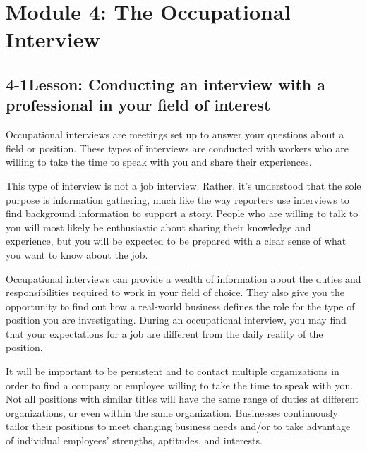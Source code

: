 \pagebreak \section*{Module 4:	The Occupational Interview}
\noindent\makebox[\textwidth]{\rule{\linewidth}{0.4pt}} 
\localtableofcontents 
\noindent\makebox[\textwidth]{\rule{\linewidth}{0.4pt}} 


\pagebreak \subsection*{4-1\quad  Lesson: Conducting an interview with a professional in your field of interest}
Occupational interviews are meetings set up to answer your questions about a field or position. These types of interviews are conducted with workers who are willing to take the time to speak with you and share their experiences.

This type of interview is not a job interview. Rather, it's understood that the sole purpose is information gathering, much like the way reporters use interviews to find background information to support a story. People who are willing to talk to you will most likely be enthusiastic about sharing their knowledge and experience, but you will be expected to be prepared with a clear sense of what you want to know about the job.

Occupational interviews can provide a wealth of information about the duties and responsibilities required to work in your field of choice. They also give you the opportunity to find out how a real-world business defines the role for the type of position you are investigating. During an occupational interview, you may find that your expectations for a job are different from the daily reality of the position.

It will be important to be persistent and to contact multiple organizations in order to find a company or employee willing to take the time to speak with you. Not all positions with similar titles will have the same range of duties at different organizations, or even within the same organization. Businesses continuously tailor their positions to meet changing business needs and/or to take advantage of individual employees' strengths, aptitudes, and interests.

